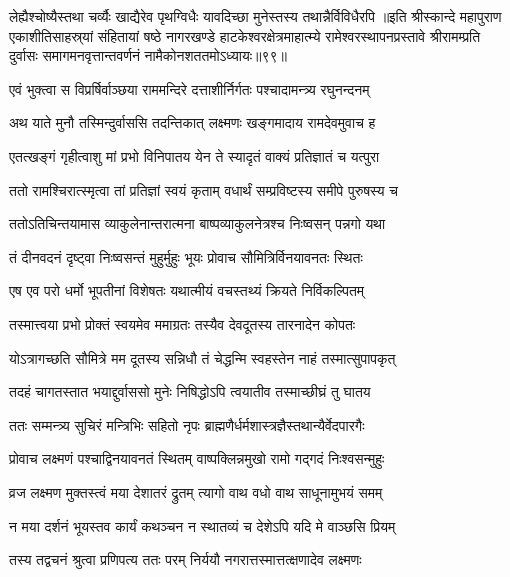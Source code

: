 \twolineshloka
{लेह्यैश्चोष्यैस्तथा चर्व्यैः खाद्यैरेव पृथग्विधैः}
{यावदिच्छा मुनेस्तस्य तथान्नैर्विविधैरपि}%
॥इति श्रीस्कान्दे महापुराण एकाशीतिसाहस्र्यां संहितायां षष्ठे नागरखण्डे हाटकेश्वरक्षेत्रमाहात्म्ये रामेश्वरस्थापनप्रस्तावे श्रीरामम्प्रति दुर्वासः समागमनवृत्तान्तवर्णनं नामैकोनशततमोऽध्यायः॥९९॥


\twolineshloka
{एवं भुक्त्वा स विप्रर्षिर्वाञ्छया राममन्दिरे}
{दत्ताशीर्निर्गतः पश्चादामन्त्र्य रघुनन्दनम्}%

\twolineshloka
{अथ याते मुनौ तस्मिन्दुर्वाससि तदन्तिकात्}
{लक्ष्मणः खङ्गमादाय रामदेवमुवाच ह}%

\twolineshloka
{एतत्खङ्गं गृहीत्वाशु मां प्रभो विनिपातय}
{येन ते स्यादृतं वाक्यं प्रतिज्ञातं च यत्पुरा}%

\twolineshloka
{ततो रामश्चिरात्स्मृत्वा तां प्रतिज्ञां स्वयं कृताम्}
{वधार्थं सम्प्रविष्टस्य समीपे पुरुषस्य च}%

\twolineshloka
{ततोऽतिचिन्तयामास व्याकुलेनान्तरात्मना}
{बाष्पव्याकुलनेत्रश्च निःष्वसन् पन्नगो यथा}%

\twolineshloka
{तं दीनवदनं दृष्ट्वा निःष्वसन्तं मुहुर्मुहुः}
{भूयः प्रोवाच सौमित्रिर्विनयावनतः स्थितः}%

\twolineshloka
{एष एव परो धर्मो भूपतीनां विशेषतः}
{यथात्मीयं वचस्तथ्यं क्रियते निर्विकल्पितम्}%

\twolineshloka
{तस्मात्त्वया प्रभो प्रोक्तं स्वयमेव ममाग्रतः}
{तस्यैव देवदूतस्य तारनादेन कोपतः}%

\twolineshloka
{योऽत्रागच्छति सौमित्रे मम दूतस्य सन्निधौ}
{तं चेद्धन्मि स्वहस्तेन नाहं तस्मात्सुपापकृत्}%

\twolineshloka
{तदहं चागतस्तात भयाद्दुर्वाससो मुनेः}
{निषिद्धोऽपि त्वयातीव तस्माच्छीघ्रं तु घातय}%

\twolineshloka
{ततः सम्मन्त्र्य सुचिरं मन्त्रिभिः सहितो नृपः}
{ब्राह्मणैर्धर्मशास्त्रज्ञैस्तथान्यैर्वेदपारगैः}%

\twolineshloka
{प्रोवाच लक्ष्मणं पश्चाद्विनयावनतं स्थितम्}
{वाष्पक्लिन्नमुखो रामो गद्गदं निःश्वसन्मुहुः}%

\twolineshloka
{व्रज लक्ष्मण मुक्तस्त्वं मया देशातरं द्रुतम्}
{त्यागो वाथ वधो वाथ साधूनामुभयं समम्}%

\twolineshloka
{न मया दर्शनं भूयस्तव कार्यं कथञ्चन}
{न स्थातव्यं च देशेऽपि यदि मे वाञ्छसि प्रियम्}%

\twolineshloka
{तस्य तद्वचनं श्रुत्वा प्रणिपत्य ततः परम्}
{निर्ययौ नगरात्तस्मात्तत्क्षणादेव लक्ष्मणः}%

